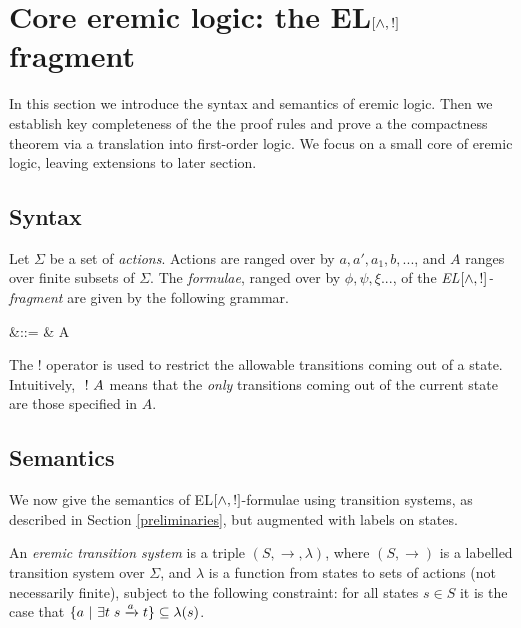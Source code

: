 \section{Core eremic logic: the EL$[\land, !]$ fragment}\label{coreEL}

In this section we introduce the syntax and semantics of eremic logic.
Then we establish key completeness of the the proof rules and prove a
the compactness theorem via a translation into first-order logic. We
focus on a small core of eremic logic, leaving extensions to later
section.

\subsection{Syntax}



\begin{definition} Let $\Sigma$ be a set of \emph{actions}.
Actions are ranged over by $a, a', a_1, b, ...$, and $A$ ranges over
finite subsets of $\Sigma$. The \emph{formulae}, ranged over by
$\phi, \psi, \xi ...$, of the \emph{EL$[\land, !]$-fragment} are given
by the following grammar.

\begin{GRAMMAR}
  \phi 
     &\quad ::= \quad & 
  \TRUE 
     \VERTICAL 
  \phi \AND \psi
     \VERTICAL 
     \VERTICAL 
  \fBang A 
\end{GRAMMAR}

\NI The $!$ operator is used to restrict the allowable transitions
coming out of a state.  Intuitively, $\ ! \  A$ means that the
\emph{only} transitions coming out of the current state are those
specified in $A$.

\end{definition}

\subsection{Semantics}

\NI We now give the semantics of EL$[\land, !]$-formulae using
transition systems, as described in Section \ref{preliminaries}, but
augmented with labels on states.

\begin{definition}
An \emph{eremic transition system} is a triple $(S, \rightarrow,
\lambda)$, where $(S, \rightarrow)$ is a labelled transition system
over $\Sigma$, and $\lambda$ is a function from states to sets of
actions (not necessarily finite), subject to the following constraint:
for all states $s \in S$ it is the case that $ \{a \ | \  \exists t \; s
\xrightarrow{a} t\} \subseteq \lambda(s)$.

\end{definition}

